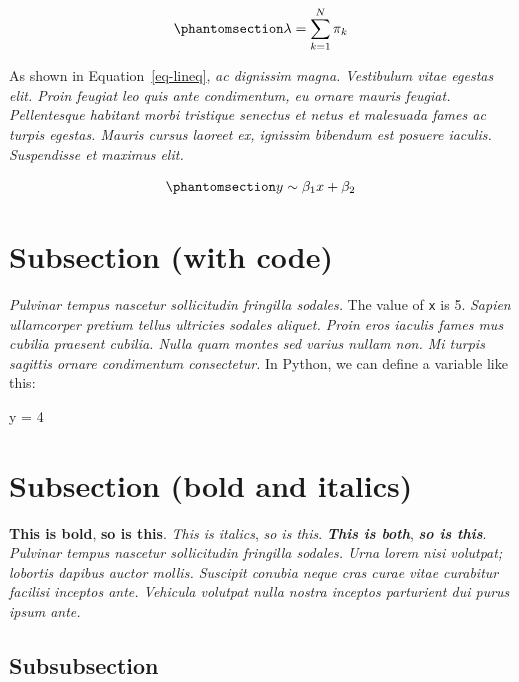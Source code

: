 \documentclass[
  10pt,
  a4paper,
]{scrbook}
\newenvironment{Shaded}{\begin{snugshade}}{\end{snugshade}}
\newcommand{\DecValTok}[1]{\textcolor[rgb]{0.69,0.50,0.00}{#1}}
\newcommand{\NormalTok}[1]{\textcolor[rgb]{0.12,0.11,0.11}{#1}}
\newcommand{\OperatorTok}[1]{\textcolor[rgb]{0.12,0.11,0.11}{#1}}
\let\oldemph\emph
\renewcommand\emph[1]{\oldemph{\color{gray}#1}} %
\renewenvironment{Shaded}
  {
    \vspace{-0.5em} %
    \begin{snugshade} %
    \small %
  }
  {
    \end{snugshade} %
    \vspace{-1em} %
  }
\newenvironment{Shaded}
  {
    \vspace{-0.5em} %
    \begin{snugshade} %
    \small %
  }
  {
    \end{snugshade} %
    \vspace{-1em} %
  }
\begin{document}
\begin{equation}\protect\phantomsection\label{eq-stat}{
\lambda = \sum_{k=1}^N \pi_k
}\end{equation}

As shown in Equation~\ref{eq-lineq}, \emph{ac dignissim magna.
Vestibulum vitae egestas elit. Proin feugiat leo quis ante condimentum,
eu ornare mauris feugiat. Pellentesque habitant morbi tristique senectus
et netus et malesuada fames ac turpis egestas. Mauris cursus laoreet ex,
ignissim bibendum est posuere iaculis. Suspendisse et maximus elit.}

\begin{equation}\protect\phantomsection\label{eq-lineq}{
y \sim \beta_1 x + \beta_2
}\end{equation}

\section{Subsection (with code)}\label{subsection-with-code}

\emph{Pulvinar tempus nascetur sollicitudin fringilla sodales.} The
value of \texttt{x} is 5. \emph{Sapien ullamcorper pretium tellus
ultricies sodales aliquet. Proin eros iaculis fames mus cubilia praesent
cubilia. Nulla quam montes sed varius nullam non. Mi turpis sagittis
ornare condimentum consectetur.} In Python, we can define a variable
like this:

\begin{Shaded}
\begin{Highlighting}[]
\NormalTok{y }\OperatorTok{=} \DecValTok{4}
\end{Highlighting}
\end{Shaded}

\section{Subsection (bold and
italics)}\label{subsection-bold-and-italics}

\textbf{This is bold}, \textbf{so is this}. \emph{This is italics},
\emph{so is this}. \textbf{\emph{This is both}}, \textbf{\emph{so is
this}}. \emph{Pulvinar tempus nascetur sollicitudin fringilla sodales.
Urna lorem nisi volutpat; lobortis dapibus auctor mollis. Suscipit
conubia neque cras curae vitae curabitur facilisi inceptos ante.
Vehicula volutpat nulla nostra inceptos parturient dui purus ipsum
ante.}

\subsection{Subsubsection}\label{subsubsection}
\end{document}
